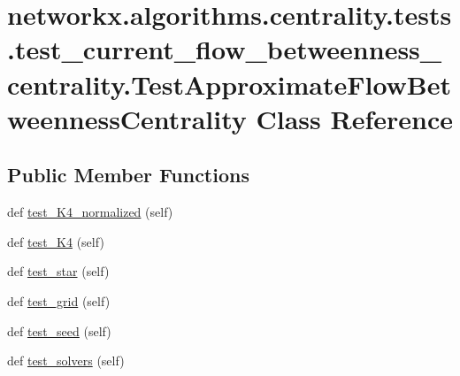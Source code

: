 \hypertarget{classnetworkx_1_1algorithms_1_1centrality_1_1tests_1_1test__current__flow__betweenness__centrali5aba835aefc4fe33e0352f52dae5ae14}{}\section{networkx.\+algorithms.\+centrality.\+tests.\+test\+\_\+current\+\_\+flow\+\_\+betweenness\+\_\+centrality.\+Test\+Approximate\+Flow\+Betweenness\+Centrality Class Reference}
\label{classnetworkx_1_1algorithms_1_1centrality_1_1tests_1_1test__current__flow__betweenness__centrali5aba835aefc4fe33e0352f52dae5ae14}
\subsection*{Public Member Functions}
\begin{DoxyCompactItemize}
\item 
def \hyperlink{classnetworkx_1_1algorithms_1_1centrality_1_1tests_1_1test__current__flow__betweenness__centrali5aba835aefc4fe33e0352f52dae5ae14_ade7383c6d3ff650975236f4758aee865}{test\+\_\+\+K4\+\_\+normalized} (self)
\item 
def \hyperlink{classnetworkx_1_1algorithms_1_1centrality_1_1tests_1_1test__current__flow__betweenness__centrali5aba835aefc4fe33e0352f52dae5ae14_ac504113e2c14a8c5d9ac5400699c974d}{test\+\_\+\+K4} (self)
\item 
def \hyperlink{classnetworkx_1_1algorithms_1_1centrality_1_1tests_1_1test__current__flow__betweenness__centrali5aba835aefc4fe33e0352f52dae5ae14_a2fd4123e574d1e03bf787b543a873276}{test\+\_\+star} (self)
\item 
def \hyperlink{classnetworkx_1_1algorithms_1_1centrality_1_1tests_1_1test__current__flow__betweenness__centrali5aba835aefc4fe33e0352f52dae5ae14_a76160ee50d293350e0c3fecb6083beea}{test\+\_\+grid} (self)
\item 
def \hyperlink{classnetworkx_1_1algorithms_1_1centrality_1_1tests_1_1test__current__flow__betweenness__centrali5aba835aefc4fe33e0352f52dae5ae14_a60ec474e7968752d1ddad27aabf838b5}{test\+\_\+seed} (self)
\item 
def \hyperlink{classnetworkx_1_1algorithms_1_1centrality_1_1tests_1_1test__current__flow__betweenness__centrali5aba835aefc4fe33e0352f52dae5ae14_a589e9b7cda474f5a6a54d57c1867f109}{test\+\_\+solvers} (self)
\end{DoxyCompactItemize}


